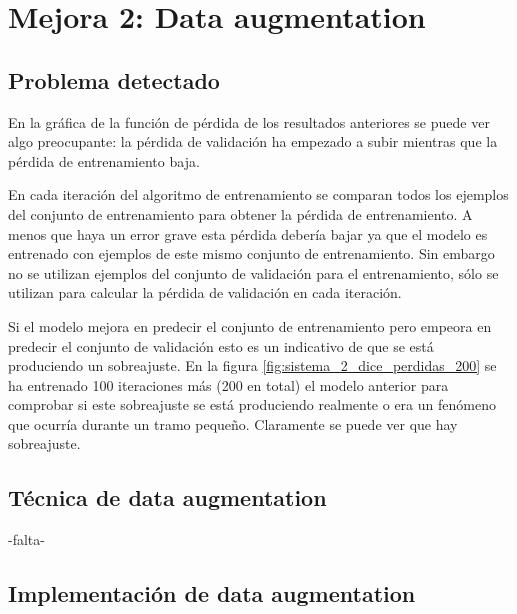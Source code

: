 \chapter{Mejora 2: Data augmentation}\label{data_augmentation}

\section{Problema detectado}\label{sec:data_augmentation_problem}

En la gráfica de la función de pérdida de los resultados anteriores se puede ver algo preocupante: la pérdida de validación ha empezado a subir mientras que la pérdida de entrenamiento baja.

En cada iteración del algoritmo de entrenamiento se comparan todos los ejemplos del conjunto de entrenamiento para obtener la pérdida de entrenamiento. A menos que haya un error grave esta pérdida debería bajar ya que el modelo es entrenado con ejemplos de este mismo conjunto de entrenamiento. Sin embargo no se utilizan ejemplos del conjunto de validación para el entrenamiento, sólo se utilizan para calcular la pérdida de validación en cada iteración.

Si el modelo mejora en predecir el conjunto de entrenamiento pero empeora en predecir el conjunto de validación esto es un indicativo de que se está produciendo un sobreajuste. En la figura \ref{fig:sistema_2_dice_perdidas_200} se ha entrenado 100 iteraciones más (200 en total) el modelo anterior para comprobar si este sobreajuste se está produciendo realmente o era un fenómeno que ocurría durante un tramo pequeño. Claramente se puede ver que hay sobreajuste.


\section{Técnica de data augmentation}\label{sec:data_augmentation_change}
-falta-
\section{Implementación de data augmentation}\label{sec:data_augmentation_change}

